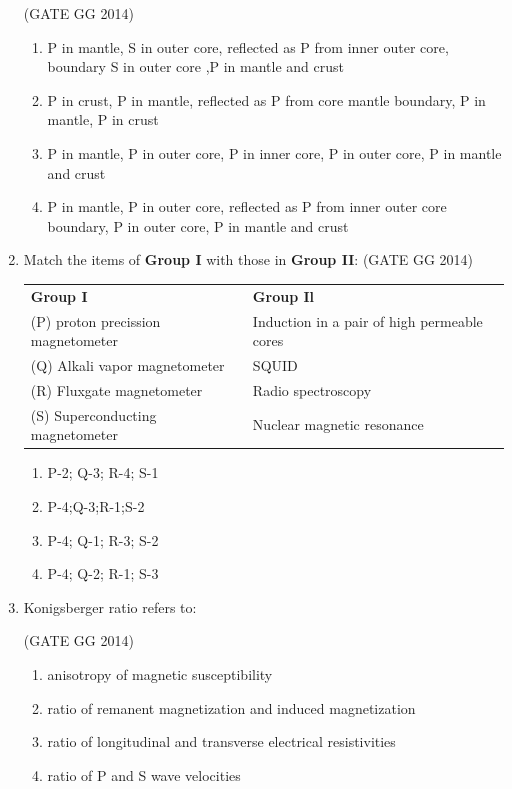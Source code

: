 \documentclass[journal]{IEEEtran}
\begin{document}
\begin{enumerate}[start=26]
\hfill(GATE GG 2014)
\begin{enumerate}
    \item P in mantle, S in outer core, reflected as P from inner outer core, boundary S in outer core ,P in mantle and crust
    \item P in crust, P in mantle, reflected as P from core mantle boundary, P in mantle, P in crust
    \item P in mantle, P in outer core, P in inner core, P in outer core, P in mantle and crust
    \item P in mantle, P in outer core, reflected as P from inner outer core boundary, P in outer core, P in mantle and crust
\end{enumerate}


\item Match the items of \textbf{Group I} with those in \textbf{Group II}:
\hfill{(GATE GG 2014)}\\
\begin{tabular}{ l l }
\textbf{Group I} & \textbf{Group Il}\\
(P) proton precission magnetometer & Induction in a pair of high permeable cores\\
(Q) Alkali vapor magnetometer & SQUID\\
(R) Fluxgate magnetometer & Radio spectroscopy\\
(S) Superconducting magnetometer & Nuclear magnetic resonance\\
\end{tabular}
\begin{multicols}{2}
\begin{enumerate}
 \item P-2; Q-3; R-4; S-1
     \item P-4;Q-3;R-1;S-2
     \item P-4; Q-1; R-3; S-2
     \item P-4; Q-2; R-1; S-3
\end{enumerate}
\end{multicols}

\item Konigsberger ratio refers to:

\hfill(GATE GG 2014)
\begin{enumerate}
    \item anisotropy of magnetic susceptibility
    \item ratio of remanent magnetization and induced magnetization
    \item ratio of longitudinal and transverse electrical resistivities
    \item ratio of P and S wave velocities
\end{enumerate}


\end{enumerate}
\end{document}
